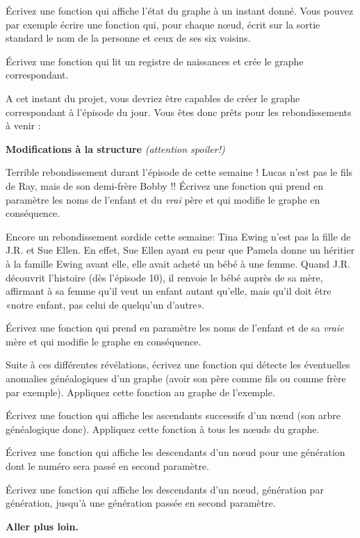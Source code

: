 \documentclass[10pt]{article}\usepackage[nu]{esial}
\begin{document}
\Question Écrivez une fonction qui affiche l'état du graphe à un instant
donné. Vous pouvez par exemple écrire une fonction qui, pour chaque nœud, écrit
sur la sortie standard le nom de la personne et ceux de ses six voisins.

\Question Écrivez une fonction qui lit un registre de naissances et crée le
graphe correspondant.

A cet instant du projet, vous devriez être capables de créer le graphe
correspondant à l'épisode du jour. Vous êtes donc prêts pour les
rebondissements à venir :

\Exercice\textbf{Modifications à la structure} \textit{(attention spoiler!)}

\Question Terrible rebondissement durant l'épisode de cette semaine ! Lucas
n'est pas le fils de Ray, mais de son demi-frère Bobby !! Écrivez une fonction
qui prend en paramètre les noms de l'enfant et du \emph{vrai} père et qui
modifie le graphe en conséquence.

\Question Encore un rebondissement sordide cette semaine: Tina Ewing n'est pas
la fille de J.R. et Sue Ellen. En effet, Sue Ellen ayant eu peur que Pamela
donne un héritier à la famille Ewing avant elle, elle avait acheté un bébé à
une femme. Quand J.R. découvrit l'histoire (dès l'épisode 10), il renvoie le
bébé auprès de sa mère, affirmant à sa femme qu'il veut un enfant autant
qu'elle, mais qu'il doit être «notre enfant, pas celui de quelqu'un d'autre».

Écrivez une fonction qui prend en paramètre les noms de l'enfant et de sa
\emph{vraie} mère et qui modifie le graphe en conséquence.

\Question Suite à ces différentes révélations, écrivez une fonction qui détecte
les éventuelles anomalies généalogiques d'un graphe (avoir son père comme fils
ou comme frère par exemple). Appliquez cette fonction au graphe de l'exemple.

\Question Écrivez une fonction qui affiche les ascendants successifs d'un nœud
(son arbre généalogique donc). Appliquez cette fonction à tous les nœuds du
graphe.

\Question Écrivez une fonction qui affiche les descendants d'un nœud pour une
génération dont le numéro sera passé en second paramètre.

\Question Écrivez une fonction qui affiche les descendants d'un nœud, génération
par génération, jusqu'à une génération passée en second paramètre.

\Exercice\textbf{Aller plus loin.}
\end{document}
